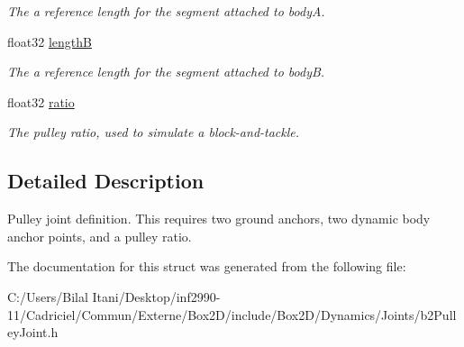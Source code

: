 \begin{DoxyCompactItemize}
\begin{DoxyCompactList}\small\item\em The a reference length for the segment attached to bodyA. \end{DoxyCompactList}\item 
float32 \hyperlink{structb2_pulley_joint_def_a5857d5b5b9880b6c8201ce3ee8c3eef0}{lengthB}\hypertarget{structb2_pulley_joint_def_a5857d5b5b9880b6c8201ce3ee8c3eef0}{}\label{structb2_pulley_joint_def_a5857d5b5b9880b6c8201ce3ee8c3eef0}

\begin{DoxyCompactList}\small\item\em The a reference length for the segment attached to bodyB. \end{DoxyCompactList}\item 
float32 \hyperlink{structb2_pulley_joint_def_af35074246aeacbf239c11682642b31f5}{ratio}\hypertarget{structb2_pulley_joint_def_af35074246aeacbf239c11682642b31f5}{}\label{structb2_pulley_joint_def_af35074246aeacbf239c11682642b31f5}

\begin{DoxyCompactList}\small\item\em The pulley ratio, used to simulate a block-\/and-\/tackle. \end{DoxyCompactList}\end{DoxyCompactItemize}


\subsection{Detailed Description}
Pulley joint definition. This requires two ground anchors, two dynamic body anchor points, and a pulley ratio. 

The documentation for this struct was generated from the following file\+:\begin{DoxyCompactItemize}
\item 
C\+:/\+Users/\+Bilal Itani/\+Desktop/inf2990-\/11/\+Cadriciel/\+Commun/\+Externe/\+Box2\+D/include/\+Box2\+D/\+Dynamics/\+Joints/b2\+Pulley\+Joint.\+h\end{DoxyCompactItemize}
